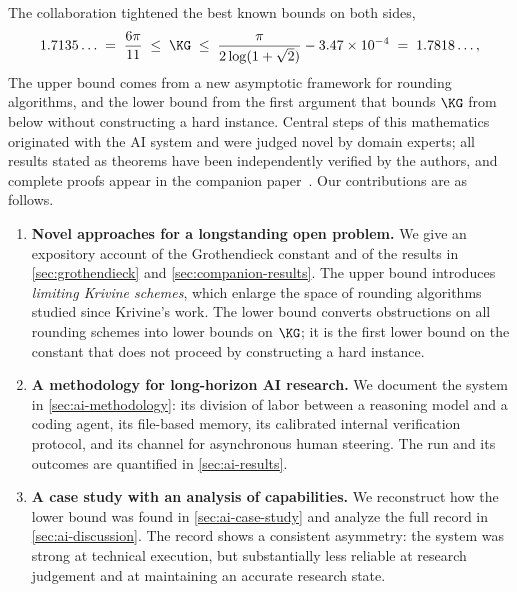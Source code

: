 The collaboration tightened the best known bounds on both sides,
\[
    1.7135\ldots
    \;=\;
    \frac{6\pi}{11}
    \;\le\;
    \KG
    \;\le\;
    \frac{\pi}{2\log(1+\sqrt2)} - 3.47\times10^{-4}
    \;=\;
    1.7818\ldots,
\]
The upper bound comes from a new asymptotic framework for rounding algorithms, and the lower bound from the first argument that bounds $\KG$ from below without constructing a hard instance.
Central steps of this mathematics originated with the AI system and were judged novel by domain experts; all results stated as theorems have been independently verified by the authors, and complete proofs appear in the companion paper~\cite{saha2026new}.
Our contributions are as follows.
\begin{enumerate}[label=(\arabic*), leftmargin=*]
    \item \textbf{Novel approaches for a longstanding open problem.}
    We give an expository account of the Grothendieck constant and of the results in \cref{sec:grothendieck} and \cref{sec:companion-results}.
    The upper bound introduces \emph{limiting Krivine schemes}, which enlarge the space of rounding algorithms studied since Krivine's work.
    The lower bound converts obstructions on all rounding schemes into lower bounds on $\KG$; it is the first lower bound on the constant that does not proceed by constructing a hard instance.

    \item \textbf{A methodology for long-horizon AI research.}
    We document the system in \cref{sec:ai-methodology}: its division of labor between a reasoning model and a coding agent, its file-based memory, its calibrated internal verification protocol, and its channel for asynchronous human steering.
    The run and its outcomes are quantified in \cref{sec:ai-results}.

    \item \textbf{A case study with an analysis of capabilities.}
    We reconstruct how the lower bound was found in \cref{sec:ai-case-study} and analyze the full record in \cref{sec:ai-discussion}.
    The record shows a consistent asymmetry: the system was strong at technical execution, but substantially less reliable at research judgement and at maintaining an accurate research state.
\end{enumerate}

